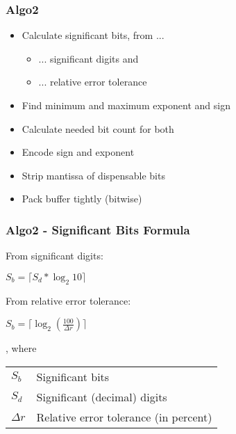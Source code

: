 \documentclass[compress]{beamer}
\begin{document}
\begin{frame}
	\frametitle{Algo2}

	\begin{itemize}
		\item Calculate significant bits, from ...
		\begin{itemize}
			\item ... significant digits and
			\item ... relative error tolerance
		\end{itemize}
		\item Find minimum and maximum exponent and sign
		\item Calculate needed bit count for both
		\item Encode sign and exponent
		\item Strip mantissa of dispensable bits
		\item Pack buffer tightly (bitwise)
	\end{itemize}

\end{frame}

\begin{frame}
	\frametitle{Algo2 - Significant Bits Formula}

	From significant digits:
	\begin{center}
		$S_{b} = \lceil S_d * \log_2{10}\rceil$
	\end{center}

	\bigskip

	From relative error tolerance:
	\begin{center}
		$S_{b} = \lceil \log_2{\left(\frac{100}{\Delta{r}}\right)}\rceil$
	\end{center}

	, where\\

	\bigskip

	\begin{tabular}{ll}
		$S_b$ & Significant bits \\
		$S_d$ & Significant (decimal) digits \\
		$\Delta{r}$ & Relative error tolerance (in percent)
	\end{tabular}

\end{frame}
\end{document}
